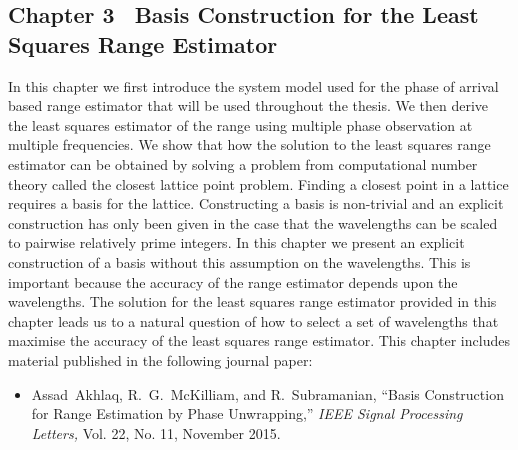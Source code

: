 \subsection*{Chapter 3 \textemdash~Basis Construction for the Least Squares Range Estimator}
In this chapter we first introduce the system model used for the phase of arrival based range estimator that will be used throughout the thesis. We then derive the least squares estimator of the range using multiple phase observation at multiple frequencies. We show that how the solution to the least squares range estimator can be obtained by solving a problem from computational number theory called the closest lattice point problem. Finding a closest point in a lattice requires a basis for the lattice. Constructing a basis is non-trivial and an explicit construction has only been given in the case that the wavelengths can be scaled to pairwise relatively prime integers. In this chapter we present an explicit construction of a basis without this assumption on the wavelengths. This is important because the accuracy of the range estimator depends upon the wavelengths. The solution for the least squares range estimator provided in this chapter leads us to a natural question of how to select a set of wavelengths that maximise the accuracy of the least squares range estimator.
\newline
This chapter includes material published in the following journal paper:
\newline
\begin{itemize}
\item{Assad~Akhlaq, R.~G.~McKilliam, and R.~Subramanian, ``{Basis Construction for Range Estimation by Phase Unwrapping},'' \emph{IEEE Signal Processing Letters,}  Vol. 22, No. 11, November 2015.}
\end{itemize}


